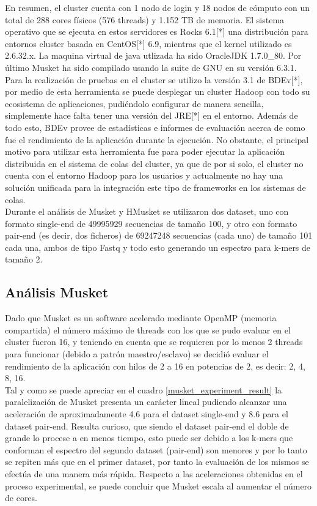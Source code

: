 \documentclass[conference]{IEEEtran}
\begin{document}
En resumen, el cluster cuenta con 1 nodo de login y 18 nodos de cómputo con un total de 288 cores físicos (576 threads) y 1.152 TB de memoria. El sistema operativo que se ejecuta en estos servidores es Rocks 6.1[*] una distribución para entornos cluster basada en CentOS[*] 6.9, mientras que el kernel utilizado es 2.6.32.x. La maquina virtual de java utlizada ha sido OracleJDK 1.7.0\_80. Por último Musket ha sido compilado usando la suite de GNU en su versión 6.3.1.\\

Para la realización de pruebas en el cluster se utilizo la versión 3.1 de BDEv[*], por medio de esta herramienta se puede desplegar un cluster Hadoop con todo su ecosistema de aplicaciones, pudiéndolo configurar de manera sencilla, simplemente hace falta tener una versión del JRE[*] en el entorno. Además de todo esto, BDEv provee de estadísticas e informes de evaluación acerca de como fue el rendimiento de la aplicación durante la ejecución. No obstante, el principal motivo para utilizar esta herramienta fue para poder ejecutar la aplicación distribuida en el sistema de colas del cluster, ya que de por si solo, el cluster no cuenta con el entorno Hadoop para los usuarios y actualmente no hay una solución unificada para la integración este tipo de frameworks en los sistemas de colas.\\

Durante el análisis de Musket y HMusket se utilizaron dos dataset, uno con formato single-end de 49995929 secuencias de tamaño 100, y otro con formato pair-end (es decir, dos ficheros) de 69247248 secuencias (cada uno) de tamaño 101 cada una, ambos de tipo Fastq y todo esto generando un espectro para k-mers de tamaño 2.\\

\subsection{Análisis Musket}
Dado que Musket es un software acelerado mediante OpenMP (memoria compartida) el número máximo de threads con los que se pudo evaluar en el cluster fueron 16, y teniendo en cuenta que se requieren por lo menos 2 threads para funcionar (debido a patrón maestro/esclavo) se decidió evaluar el rendimiento de la aplicación con hilos de 2 a 16 en potencias de 2, es decir: 2, 4, 8, 16.\\

Tal y como se puede apreciar en el cuadro \ref{musket_experiment_result} la paralelización de Musket presenta un carácter lineal pudiendo alcanzar una aceleración de aproximadamente 4.6 para el dataset single-end y 8.6 para el dataset pair-end. Resulta curioso, que siendo el dataset pair-end el doble de grande lo procese a en menos tiempo, esto puede ser debido a los k-mers que conforman el espectro del segundo dataset (pair-end) son menores y por lo tanto se repiten más que en el primer dataset, por tanto la evaluación de los mismos se efectúa de una manera más rápida. Respecto a las aceleraciones obtenidas en el proceso experimental, se puede concluir que Musket escala al aumentar el número de cores.
\end{document}

